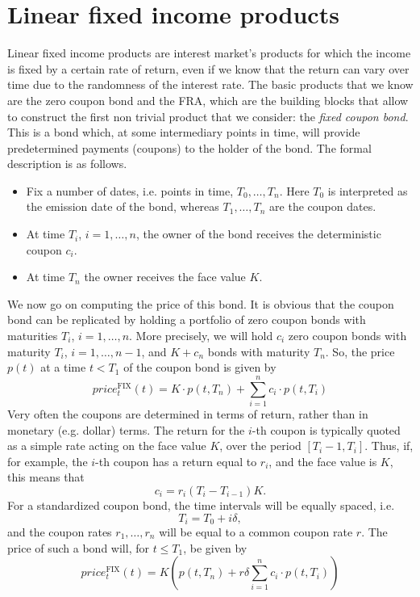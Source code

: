 \section{Linear fixed income products}
Linear fixed income products are interest market's products for which the income is fixed by a certain rate of return, even if we know that the return can vary over time due to the randomness of the interest rate. The basic products that we know are the zero coupon bond and the FRA, which are the building blocks that allow to construct the first non trivial product that we consider: the \emph{fixed coupon bond}. This is a bond which, at some intermediary points in time, will provide predetermined payments (coupons) to the holder of the bond. The formal description is as follows.
\begin{itemize}
    \item Fix a number of dates, i.e. points in time, $T_0, \dots, T_n$. Here $T_0$ is interpreted as the emission date of the bond, whereas $T_1, \dots, T_n$ are the coupon dates.
    \item At time $T_i$, $i = 1,\dots, n$, the owner of the bond receives the deterministic
    coupon $c_i$.
    \item At time $T_n$ the owner receives the face value $K$.
\end{itemize}
We now go on computing the price of this bond. It is obvious that the coupon bond can be replicated by holding a portfolio of zero coupon bonds with maturities $T_i$, $i = 1,\dots, n$. More precisely, we will hold $c_i$ zero coupon bonds with maturity $T_i$, $i = 1,\dots, n-1$, and $K+c_n$ bonds with maturity $T_n$. So, the price $p(t)$ at a time $t < T_1$ of the coupon bond is given by
\begin{equation}
    price_t^{\text{FIX}}(t) = K\cdot p(t,T_n) + \sum_{i=1}^n c_i\cdot p(t,T_i)
\end{equation}
Very often the coupons are determined in terms of return, rather than in monetary (e.g. dollar) terms. The return for the $i$-th coupon is typically quoted as a simple rate acting on the face value $K$, over the period $[T_i-1,T_i]$. Thus, if, for example, the $i$-th coupon has a return equal to $r_i$, and the face value is $K$, this means that
\begin{equation*}
    c_i = r_i(T_i - T_{i-1})K.
\end{equation*}
For a standardized coupon bond, the time intervals will be equally spaced, i.e.
\begin{equation*}
    T_i = T_0 + i\delta,
\end{equation*}
and the coupon rates $r_1,\dots,r_n$ will be equal to a common coupon rate $r$. The
price of such a bond will, for $t \le T_1$, be given by
\begin{equation}
    price_t^{\text{FIX}}(t) = K\left(p(t,T_n) + r\delta\sum_{i=1}^n c_i\cdot p(t,T_i)\right)
\end{equation}

